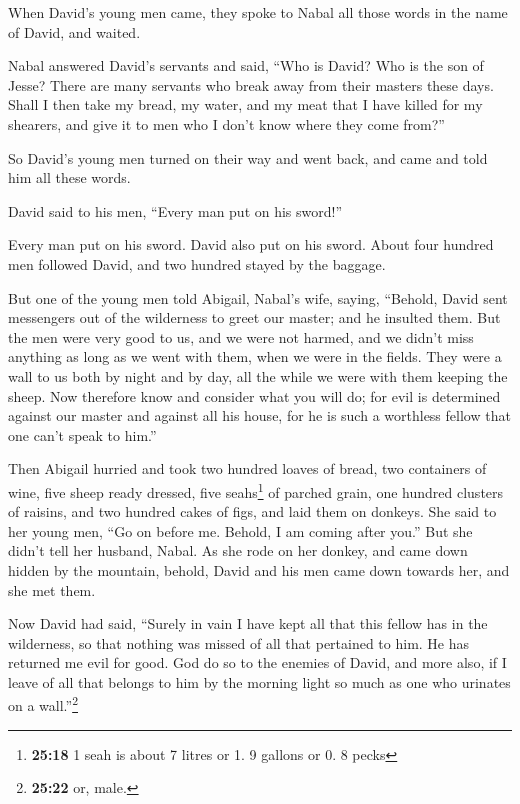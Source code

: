  When David's young men came, they spoke to Nabal all
those words in the name of David, and waited.

 Nabal answered David's servants and said, ``Who is
David? Who is the son of Jesse? There are many servants who break away
from their masters these days.  Shall I then take my
bread, my water, and my meat that I have killed for my shearers, and
give it to men who I don't know where they come from?''

 So David's young men turned on their way and went back,
and came and told him all these words.

 David said to his men, ``Every man put on his sword!''

Every man put on his sword. David also put on his sword. About four
hundred men followed David, and two hundred stayed by the baggage.

 But one of the young men told Abigail, Nabal's wife,
saying, ``Behold, David sent messengers out of the wilderness to greet
our master; and he insulted them.  But the men were very
good to us, and we were not harmed, and we didn't miss anything as long
as we went with them, when we were in the fields.  They
were a wall to us both by night and by day, all the while we were with
them keeping the sheep.  Now therefore know and consider
what you will do; for evil is determined against our master and against
all his house, for he is such a worthless fellow that one can't speak to
him.''

 Then Abigail hurried and took two hundred loaves of
bread, two containers of wine, five sheep ready dressed, five
seahs\footnote{\textbf{25:18} 1 seah is about 7 litres or 1. 9 gallons
  or 0. 8 pecks} of parched grain, one hundred clusters of raisins, and
two hundred cakes of figs, and laid them on donkeys.  She
said to her young men, ``Go on before me. Behold, I am coming after
you.'' But she didn't tell her husband, Nabal.  As she
rode on her donkey, and came down hidden by the mountain, behold, David
and his men came down towards her, and she met them.

 Now David had said, ``Surely in vain I have kept all
that this fellow has in the wilderness, so that nothing was missed of
all that pertained to him. He has returned me evil for good.
 God do so to the enemies of David, and more also, if I
leave of all that belongs to him by the morning light so much as one who
urinates on a wall.''\footnote{\textbf{25:22} or, male.}

